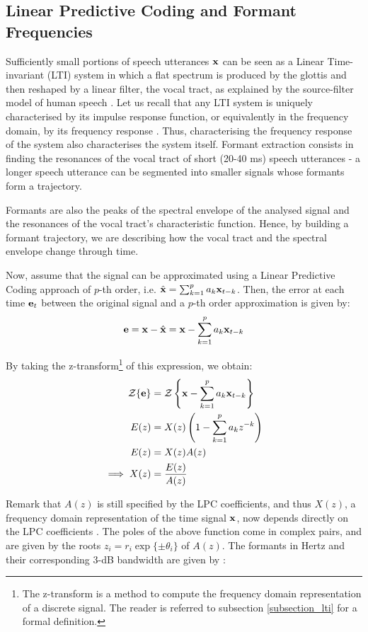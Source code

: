 \documentclass[../main.tex]{subfiles} \label{chapter_soa}
\begin{document}
\subsection{Linear Predictive Coding and Formant Frequencies} \label{subsection_formants}
Sufficiently small portions of speech utterances $\mathbf{x}$ can be seen as a Linear Time-invariant (LTI) system in which a flat spectrum is produced by the glottis and then reshaped by a linear filter, the vocal tract, as explained by the source-filter model of human speech \cite{Bello}. Let us recall that any LTI system is uniquely characterised by its impulse response function, or equivalently in the frequency domain, by its frequency response \cite{markel1976}. Thus, characterising the frequency response of the system also characterises the system itself. Formant extraction consists in finding the resonances of the vocal tract of short (20-40 ms) speech utterances - a longer speech utterance can be segmented into smaller signals whose formants form a trajectory.
\par Formants are also the peaks of the spectral envelope of the analysed signal and the resonances of the vocal tract's characteristic function. Hence, by building a formant trajectory, we are describing how the vocal tract and the spectral envelope change through time.
\par Now, assume that the signal can be approximated using a Linear Predictive Coding approach of $p$-th order, i.e. $\hat{\mathbf{x}} = \sum_{k=1}^pa_k\mathbf{x}_{t-k}$. Then, the error at each time $\mathbf{e}_t$ between the original signal and a $p$-th order approximation is given by: 
\begin{align*}
\mathbf{e} = \mathbf{x} - \hat{\mathbf{x}} = \mathbf{x} - \sum_{k=1}^p{a_k \mathbf{x}_{t-k}}
\end{align*} 
\par By taking the z-transform\footnote{The z-transform is a method to compute the frequency domain representation of a discrete signal. The reader is referred to subsection \ref{subsection_lti} for a formal definition.} of this expression, we obtain:
\begin{align*}
\mathcal{Z}\{\mathbf{e}\} &= \mathcal{Z}\left\{\mathbf{x} - \sum_{k=1}^p{a_k \mathbf{x}_{t-k}}\right\}\\
E(z) &= X(z)\left(1-\sum_{k=1}^p{a_k z^{-k}}\right)\\
E(z) &= X(z)A(z)\\
\implies X(z) &= \frac{E(z)}{A(z)}
\end{align*}
\par Remark that $A(z)$ is still specified by the LPC coefficients, and thus $X(z)$, a frequency domain representation of the time signal $\mathbf{x}$, now depends directly on the LPC coefficients \cite{Hosom2006}. The poles of the above function come in complex pairs, and are given by the roots $z_i = r_i\exp{\{\pm\theta_i\}}$ of $A(z)$. The formants in Hertz and their corresponding 3-dB bandwidth are given by \cite{Snell1993,Mathworks2015}:
\end{document}
